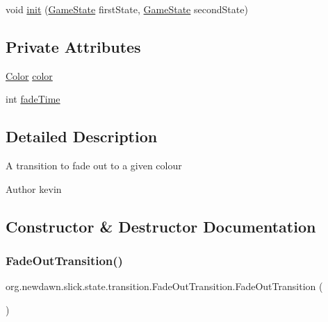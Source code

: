 \begin{DoxyCompactItemize}
\item 
void \mbox{\hyperlink{classorg_1_1newdawn_1_1slick_1_1state_1_1transition_1_1_fade_out_transition_aaf4f47fa4c7b06de675aa1c75f1c0f19}{init}} (\mbox{\hyperlink{interfaceorg_1_1newdawn_1_1slick_1_1state_1_1_game_state}{Game\+State}} first\+State, \mbox{\hyperlink{interfaceorg_1_1newdawn_1_1slick_1_1state_1_1_game_state}{Game\+State}} second\+State)
\end{DoxyCompactItemize}
\subsection*{Private Attributes}
\begin{DoxyCompactItemize}
\item 
\mbox{\hyperlink{classorg_1_1newdawn_1_1slick_1_1_color}{Color}} \mbox{\hyperlink{classorg_1_1newdawn_1_1slick_1_1state_1_1transition_1_1_fade_out_transition_a71c42f67f13c8572900a197aef96aa90}{color}}
\item 
int \mbox{\hyperlink{classorg_1_1newdawn_1_1slick_1_1state_1_1transition_1_1_fade_out_transition_ad34428b2e0502b887e293c1db61fe979}{fade\+Time}}
\end{DoxyCompactItemize}


\subsection{Detailed Description}
A transition to fade out to a given colour

\begin{DoxyAuthor}{Author}
kevin 
\end{DoxyAuthor}


\subsection{Constructor \& Destructor Documentation}
\mbox{\label{classorg_1_1newdawn_1_1slick_1_1state_1_1transition_1_1_fade_out_transition_acf33df48dc7720656301aaf0efc64c0d}} 
\subsubsection{\texorpdfstring{Fade\+Out\+Transition()}{FadeOutTransition()}\hspace{0.1cm}{\footnotesize\ttfamily [1/3]}}
{\footnotesize\ttfamily org.\+newdawn.\+slick.\+state.\+transition.\+Fade\+Out\+Transition.\+Fade\+Out\+Transition (\begin{DoxyParamCaption}{ }\end{DoxyParamCaption})\hspace{0.3cm}{\ttfamily [inline]}}

